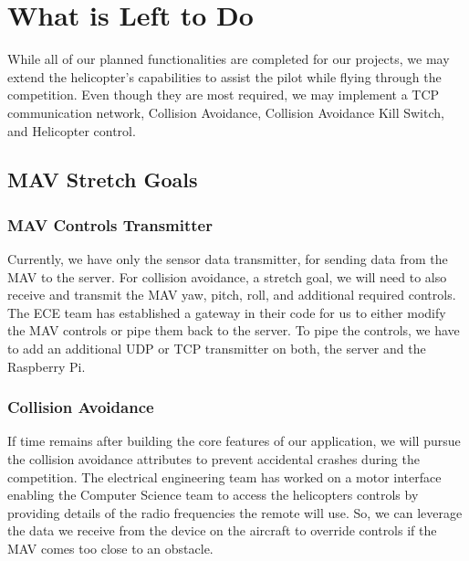 \documentclass[onecolumn, oneside, letterpaper, draftclsnofoot, 10pt, compsoc]{IEEEtran}
\begin{document}

\section{What is Left to Do}

\noindent
While all of our planned functionalities are completed for our projects, we may extend the helicopter's capabilities to assist the pilot while flying through the competition. Even though they are most required, we may implement a TCP communication network, Collision Avoidance, Collision Avoidance Kill Switch, and Helicopter control.


\subsection{MAV Stretch Goals}
\subsubsection{MAV Controls Transmitter}
\noindent
Currently, we have only the sensor data transmitter, for sending data from the MAV to the server. For collision avoidance, a stretch goal, we will need to also receive and transmit the MAV yaw, pitch, roll, and additional required controls. The ECE team has established a gateway in their code for us to either modify the MAV controls or pipe them back to the server. To pipe the controls, we have to add an additional UDP or TCP transmitter on both, the server and the Raspberry Pi.

\subsubsection{Collision Avoidance}
If time remains after building the core features of our application, we will pursue the collision avoidance attributes to prevent accidental crashes during the competition. The electrical engineering team has worked on a motor interface enabling the Computer Science team to access the helicopter\textquotesingle s controls by providing details of the radio frequencies the remote will use. So, we can leverage the data we receive from the device on the aircraft to override controls if the MAV comes too close to an obstacle.
\end{document}
